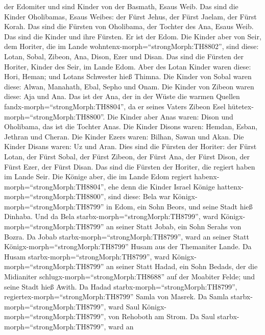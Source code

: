 der Edomiter und sind Kinder von der Basmath, Esaus Weib. 
Das sind die Kinder Oholibamas, Esaus Weibes: der Fürst Jehus, der Fürst
Jaelam, der Fürst Korah. Das sind die Fürsten von Oholibama, der Tochter
des Ana, Esaus Weib.  Das sind die Kinder und ihre Fürsten.
Er ist der Edom.  Die Kinder aber von Seir, dem Horiter,
die im Lande wohntenx-morph=``strongMorph:TH8802'', sind diese: Lotan,
Sobal, Zibeon, Ana, Dison, Ezer und Disan.  Das sind die
Fürsten der Horiter, Kinder des Seir, im Lande Edom.  Aber
des Lotan Kinder waren diese: Hori, Heman; und Lotans Schwester hieß
Thimna.  Die Kinder von Sobal waren diese: Alwan, Manahath,
Ebal, Sepho und Onam.  Die Kinder von Zibeon waren diese:
Aja und Ana. Das ist der Ana, der in der Wüste die warmen Quellen
fandx-morph=``strongMorph:TH8804'', da er seines Vaters Zibeon Esel
hütetex-morph=``strongMorph:TH8800''.  Die Kinder aber Anas
waren: Dison und Oholibama, das ist die Tochter Anas.  Die
Kinder Disons waren: Hemdan, Esban, Jethran und Cheran. 
Die Kinder Ezers waren: Bilhan, Sawan und Akan.  Die Kinder
Disans waren: Uz und Aran.  Dies sind die Fürsten der
Horiter: der Fürst Lotan, der Fürst Sobal, der Fürst Zibeon, der Fürst
Ana,  der Fürst Dison, der Fürst Ezer, der Fürst Disan. Das
sind die Fürsten der Horiter, die regiert haben im Lande Seir.
 Die Könige aber, die im Lande Edom regiert
habenx-morph=``strongMorph:TH8804'', ehe denn die Kinder Israel Könige
hattenx-morph=``strongMorph:TH8800'', sind diese:  Bela war
Königx-morph=``strongMorph:TH8799'' in Edom, ein Sohn Beors, und seine
Stadt hieß Dinhaba.  Und da Bela
starbx-morph=``strongMorph:TH8799'', ward
Königx-morph=``strongMorph:TH8799'' an seiner Statt Jobab, ein Sohn
Serahs von Bozra.  Da Jobab
starbx-morph=``strongMorph:TH8799'', ward an seiner Statt
Königx-morph=``strongMorph:TH8799'' Husam aus der Themaniter Lande.
 Da Husam starbx-morph=``strongMorph:TH8799'', ward
Königx-morph=``strongMorph:TH8799'' an seiner Statt Hadad, ein Sohn
Bedads, der die Midianiter schlugx-morph=``strongMorph:TH8688'' auf der
Moabiter Felde; und seine Stadt hieß Awith.  Da Hadad
starbx-morph=``strongMorph:TH8799'',
regiertex-morph=``strongMorph:TH8799'' Samla von Masrek. 
Da Samla starbx-morph=``strongMorph:TH8799'', ward Saul
Königx-morph=``strongMorph:TH8799'', von Rehoboth am Strom.
 Da Saul starbx-morph=``strongMorph:TH8799'', ward an
